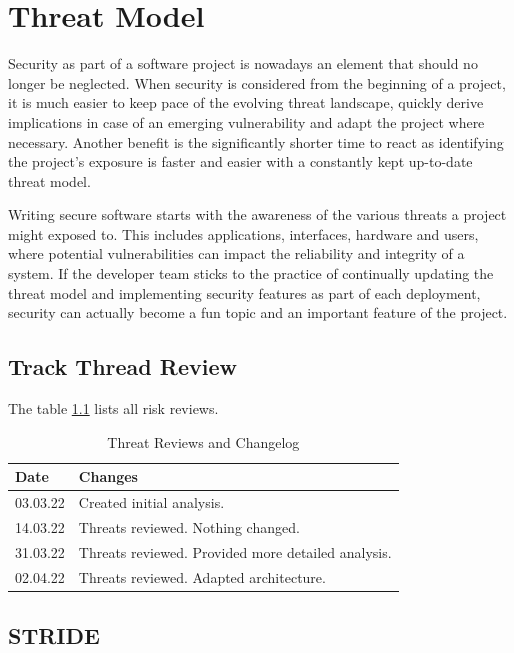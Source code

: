 \chapter{Threat Model}

Security as part of a software project is nowadays an element that should no longer be neglected. When security is considered from the beginning of a project, it is much easier to keep pace of the evolving threat landscape, quickly derive implications in case of an emerging vulnerability and adapt the project where necessary. Another benefit is the significantly shorter time to react as identifying the project's exposure is faster and easier with a constantly kept up-to-date threat model.

Writing secure software starts with the awareness of the various threats a project might exposed to. This includes applications, interfaces, hardware and users, where potential vulnerabilities can impact the reliability and integrity of a system. If the developer team sticks to the practice of continually updating the threat model and implementing security features as part of each deployment, security can actually become a fun topic and an important feature of the project.

\section{Track Thread Review}
The table \ref{tab:threat-review} lists all risk reviews.

\begin{table}[h!]
  \centering
  \caption{\label{tab:threat-review}Threat Reviews and Changelog}
  \begin{tabular}{ | l | l | }
    \hline
    \textbf{Date} & \textbf{Changes} \\
    \hline
    03.03.22 & Created initial analysis. \\
    \hline
    14.03.22 & Threats reviewed. Nothing changed. \\
    \hline
    31.03.22 & Threats reviewed. Provided more detailed analysis. \\
    \hline
    02.04.22 & Threats reviewed. Adapted architecture.\\
    \hline
  \end{tabular}
\end{table}

\section{STRIDE}

